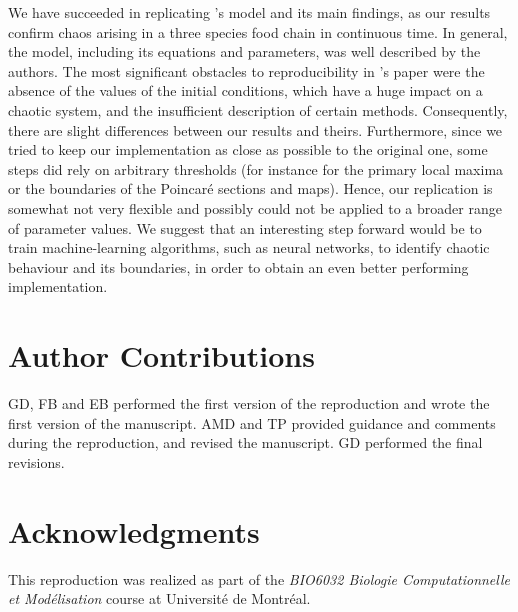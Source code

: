 We have succeeded in replicating \citeauthor{hastings1991}'s model and its main findings, as our
results confirm chaos arising in a three species food chain in continuous time.
In general, the model, including its equations and parameters, was well described by the
authors. The most significant obstacles to reproducibility in \citeauthor{hastings1991}'s paper
were the absence of the values of the initial conditions, which have a huge impact on a
chaotic system, and the insufficient description of certain methods.
Consequently, there are slight differences between our results and theirs.
Furthermore, since we tried to keep our implementation as close as possible to the
original one, some steps did rely on arbitrary thresholds (for instance for the primary
local maxima or the boundaries of the Poincaré sections and maps).
Hence, our replication is somewhat not very flexible and possibly could not be applied to
a broader range of parameter values.
We suggest that an interesting step forward would be to train machine-learning algorithms,
such as neural networks, to identify chaotic behaviour and its boundaries, in order to
obtain an even better performing implementation.

\section{Author Contributions}
GD, FB and EB performed the first version of the reproduction and wrote the first version of the manuscript. AMD and TP provided guidance and comments during the reproduction, and revised the manuscript. GD performed the final revisions.

\section{Acknowledgments}
This reproduction was realized as part of the \textit{BIO6032 Biologie Computationnelle et Modélisation} course at Université de Montréal.

\newpage

